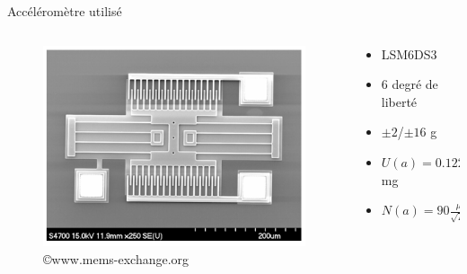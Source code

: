 \documentclass{beamer}
\begin{document}
	\begin{frame}{Accéléromètre utilisé}
		\begin{columns}
			\begin{column}{0.5\textwidth}
				\begin{figure}
					\includegraphics[width=\textwidth]{Image/microsensor_microactuator.png}
					\caption{\copyright www.mems-exchange.org}
				\end{figure}
			\end{column}
			\begin{column}{0.5\textwidth}
				\begin{itemize}
					\item LSM6DS3
					\item 6 degré de liberté 
					\item $\pm 2$/$\pm 16$ g
					\item $U(a)=0.122$ mg 
					\item $N(a) = 90 \frac{\mu g}{\sqrt{Hz}}$ 
				\end{itemize}
			\end{column}
			
		\end{columns}
	\end{frame}
\end{document}
